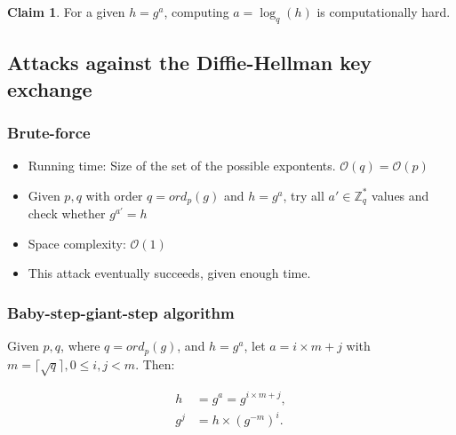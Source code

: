 \documentclass[11pt]{article}
\theoremstyle{definition}
\newtheorem{claim}{Claim}[section]
\theoremstyle{proof}
\begin{document}
\begin{claim}
	For a given $h = g^a$, computing $a = \log_q(h)$ is computationally hard.
\end{claim}

\subsection{Attacks against the Diffie-Hellman key exchange}

\subsubsection{Brute-force}

\begin{itemize}
	\item Running time: Size of the set of the possible expontents. $\mathcal{O}(q) = \mathcal{O}(p)$
	\item Given $p, q$ with order $q = ord_p(g)$ and $h = g^a$, try all $a' \in \mathbb{Z}_q^*$ values and check whether $g^{a'} = h$
	\item Space complexity: $\mathcal{O}(1)$
	\item This attack eventually succeeds, given enough time.
\end{itemize}

\subsubsection{Baby-step-giant-step algorithm}

Given $p, q$, where $q = ord_p(g)$, and $h = g^a$, let $a = i \times m + j$ with $m = \lceil\sqrt{q}\rceil, 0 \le i, j < m$. Then:

\begin{align}
	h &= g^a = g^{i \times m + j},\\
	g^j &= h \times (g^{-m})^i.	
\end{align}
\end{document}
